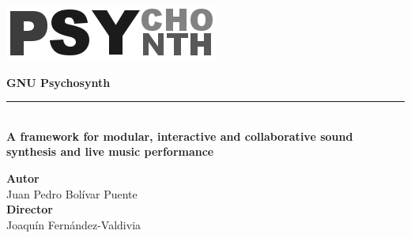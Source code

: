 
\begin{titlepage}  
  \thispagestyle{empty}


    \centering

    \vspace{3.3cm}

    \includegraphics[width=.5\textwidth]{pic/logo-psynth.png} 

    \vspace{0.5cm}

    {\Huge\bfseries\sffamily GNU Psychosynth\\}
    \noindent\rule[-1ex]{\textwidth}{3pt}\\[3.5ex]
    {\large\bfseries A framework for modular,
      interactive and collaborative sound synthesis and live music
      performance\\[4cm]}

  
    \centering

    \textbf{Autor}\\ {Juan Pedro Bolívar Puente}\\[2.5ex]
    \textbf{Director}\\
    {Joaquín Fernández-Valdivia}\\[2cm]


\end{titlepage}

